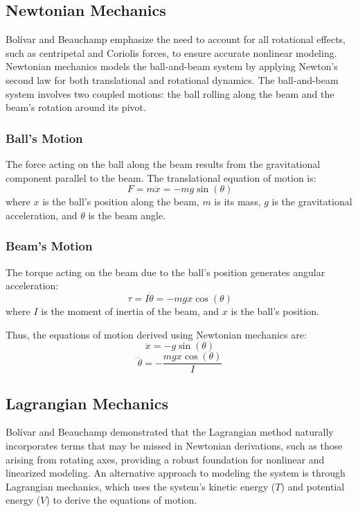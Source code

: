\documentclass[conference]{IEEEtran}
\begin{document}
\subsection{Newtonian Mechanics}
Bolívar and Beauchamp \cite{bolivar2014} emphasize the need to account for all rotational effects, such as centripetal and Coriolis forces, to ensure accurate nonlinear modeling.
\label{subsec:model_newtonian}
Newtonian mechanics models the ball-and-beam system by applying Newton's second law for both translational and rotational dynamics. The ball-and-beam system involves two coupled motions: the ball rolling along the beam and the beam's rotation around its pivot.

\subsubsection{Ball's Motion}
\label{subsubsec:model_newt_ball}
The force acting on the ball along the beam results from the gravitational component parallel to the beam. The translational equation of motion is:
\begin{equation}
F = m \ddot{x} = -m g \sin(\theta)
\end{equation}
where \(x\) is the ball's position along the beam, \(m\) is its mass, \(g\) is the gravitational acceleration, and \(\theta\) is the beam angle.

\subsubsection{Beam's Motion}
\label{subsubsec:model_newt_beam}
The torque acting on the beam due to the ball's position generates angular acceleration:
\begin{equation}
\tau = I \ddot{\theta} = -m g x \cos(\theta)
\end{equation}
where \(I\) is the moment of inertia of the beam, and \(x\) is the ball's position. 

Thus, the equations of motion derived using Newtonian mechanics are:
\begin{equation}
\ddot{x} = -g \sin(\theta)
\end{equation}
\begin{equation}
\ddot{\theta} = -\frac{m g x \cos(\theta)}{I}
\end{equation}

\subsection{Lagrangian Mechanics}
Bolívar and Beauchamp \cite{bolivar2014} demonstrated that the Lagrangian method naturally incorporates terms that may be missed in Newtonian derivations, such as those arising from rotating axes, providing a robust foundation for nonlinear and linearized modeling.
\label{subsec:model_lagrangian}
An alternative approach to modeling the system is through Lagrangian mechanics, which uses the system's kinetic energy (\(T\)) and potential energy (\(V\)) to derive the equations of motion.
\end{document}
